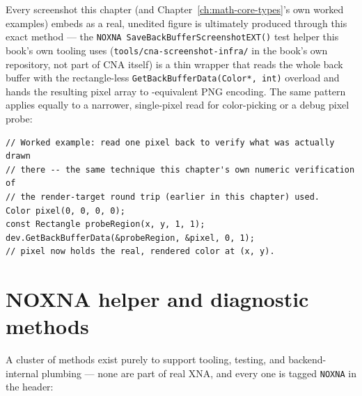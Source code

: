 Every screenshot this chapter (and Chapter~\ref{ch:math-core-types}'s own worked examples)
embeds as a real, unedited figure is ultimately produced through this exact method --- the
\texttt{NOXNA SaveBackBufferScreenshotEXT()} test helper this book's own tooling uses
(\texttt{tools/cna-screenshot-infra/} in the book's own repository, not part of CNA itself)
is a thin wrapper that reads the whole back buffer with the rectangle-less
\texttt{GetBackBufferData(Color*, int)} overload and hands the resulting pixel array to
-equivalent PNG encoding. The same pattern applies equally to a
narrower, single-pixel read for color-picking or a debug pixel probe:

\begin{lstlisting}
// Worked example: read one pixel back to verify what was actually drawn
// there -- the same technique this chapter's own numeric verification of
// the render-target round trip (earlier in this chapter) used.
Color pixel(0, 0, 0, 0);
const Rectangle probeRegion(x, y, 1, 1);
dev.GetBackBufferData(&probeRegion, &pixel, 0, 1);
// pixel now holds the real, rendered color at (x, y).
\end{lstlisting}

\section{NOXNA helper and diagnostic methods}
\label{sec:noxna-helpers}

A cluster of methods exist purely to support tooling, testing, and backend-internal plumbing
--- none are part of real XNA, and every one is tagged \texttt{NOXNA} in the header:

